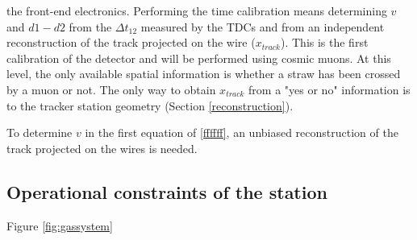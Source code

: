 the front-end electronics. 
Performing the time calibration means 
determining $v$ and $d1-d2$ from the $\Delta t_{12}$ 
measured by the TDCs and from an independent 
reconstruction of the track 
projected on the wire ($x_{track}$).
This is the first calibration of the detector and 
will be performed using cosmic muons. 
At this level, the only available spatial 
information is whether a straw has been crossed 
by a muon or not. The 
only way to obtain $x_{track}$ from a "yes or no" 
information is to  the tracker station 
geometry (Section \ref{reconstruction}).

To determine $v$ in the first equation of \ref{ffffff}, 
an unbiased reconstruction of the 
track projected on the wires is needed.


\subsection{Operational constraints of the station}\label{gassystem}

Figure \ref{fig:gassystem} 

